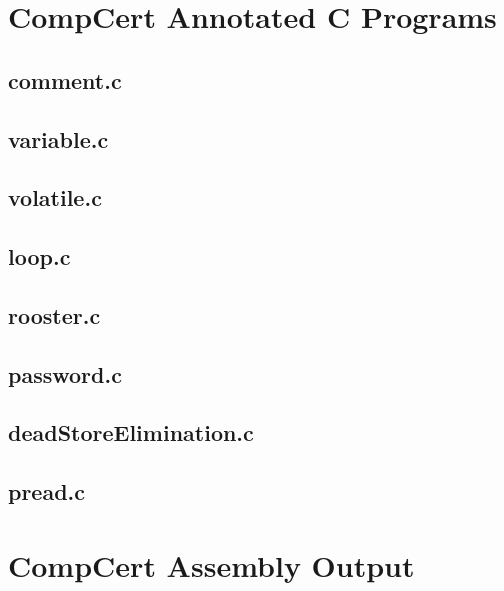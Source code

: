 \begin{appendices}
\section{CompCert Annotated C Programs}
\label{app:compCertC}
\subsection{comment.c}


\subsection{variable.c}


\subsection{volatile.c}


\subsection{loop.c}


\subsection{rooster.c}


\subsection{password.c}


\subsection{deadStoreElimination.c}


\subsection{pread.c}


\section{CompCert Assembly Output}
\label{app:compCertAssembly}
\lstset{language=[x64]Assembler}

\end{appendices}
